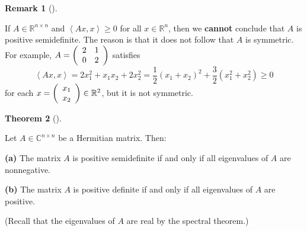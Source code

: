 \documentclass[numbers=enddot,12pt,final,onecolumn,notitlepage]{scrartcl}%
\numberwithin{exer}{subsection}
\theoremstyle{definition}
\newtheorem{theo}{Theorem}[subsection]
\newenvironment{theorem}[1][]
{\begin{theo}[#1]\begin{leftbar}}
{\end{leftbar}\end{theo}}
\newtheorem{remk}[theo]{Remark}
\newenvironment{remark}[1][]
{\begin{remk}[#1]\begin{leftbar}}
{\end{leftbar}\end{remk}}
\begin{document}
\begin{remark}
If $A\in\mathbb{R}^{n\times n}$ and $\left\langle Ax,x\right\rangle \geq0$ for
all $x\in\mathbb{R}^{n}$, then we \textbf{cannot} conclude that $A$ is
positive semidefinite. The reason is that it does not follow that $A$ is
symmetric. For example, $A=\left(
\begin{array}
[c]{cc}%
2 & 1\\
0 & 2
\end{array}
\right)  $ satisfies
\[
\left\langle Ax,x\right\rangle =2x_{1}^{2}+x_{1}x_{2}+2x_{2}^{2}=\dfrac{1}%
{2}\left(  x_{1}+x_{2}\right)  ^{2}+\dfrac{3}{2}\left(  x_{1}^{2}+x_{2}%
^{2}\right)  \geq0
\]
for each $x=\left(
\begin{array}
[c]{c}%
x_{1}\\
x_{2}%
\end{array}
\right)  \in\mathbb{R}^{2}$, but it is not symmetric.
\end{remark}

\begin{theorem}
\label{thm.herm.pos-semdef-using-evals}Let $A\in\mathbb{C}^{n\times n}$ be a
Hermitian matrix. Then: \medskip

\textbf{(a)} The matrix $A$ is positive semidefinite if and only if all
eigenvalues of $A$ are nonnegative. \medskip

\textbf{(b)} The matrix $A$ is positive definite if and only if all
eigenvalues of $A$ are positive. \medskip

(Recall that the eigenvalues of $A$ are real by the spectral theorem.)
\end{theorem}
\end{document}
